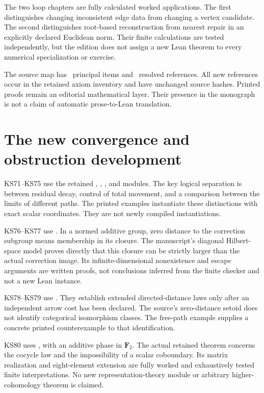 \documentclass[11pt]{article}
\begin{document}
The two loop chapters are fully calculated worked applications. The first distinguishes changing inconsistent edge data from changing a vertex candidate. The second distinguishes root-based reconstruction from nearest repair in an explicitly declared Euclidean norm. Their finite calculations are tested independently, but the edition does not assign a new Lean theorem to every numerical specialization or exercise.

The source map has \EditionClaims\ principal items and \EditionReferences\ resolved references. All new references occur in the retained axiom inventory and have unchanged source hashes. Printed proofs remain an editorial mathematical layer. Their presence in the monograph is not a claim of automatic prose-to-Lean translation.

\section{The new convergence and obstruction development}
KS71--KS75 use the retained , , , and  modules. The key logical separation is between residual decay, control of total movement, and a comparison between the limits of different paths. The printed examples instantiate these distinctions with exact scalar coordinates. They are not newly compiled instantiations.

KS76--KS77 use . In a normed additive group, zero distance to the correction subgroup means membership in its closure. The manuscript's diagonal Hilbert-space model proves directly that this closure can be strictly larger than the actual correction image. Its infinite-dimensional nonexistence and escape arguments are written proofs, not conclusions inferred from the finite checker and not a new Lean instance.

KS78--KS79 use . They establish extended directed-distance laws only after an independent arrow cost has been declared. The source's zero-distance setoid does not identify categorical isomorphism classes. The free-path example supplies a concrete printed counterexample to that identification.

KS80 uses , with an additive phase in \(\mathbf F_2\). The actual retained theorem concerns the cocycle law and the impossibility of a scalar coboundary. Its matrix realization and eight-element extension are fully worked and exhaustively tested finite interpretations. No new representation-theory module or arbitrary higher-cohomology theorem is claimed.
\end{document}
